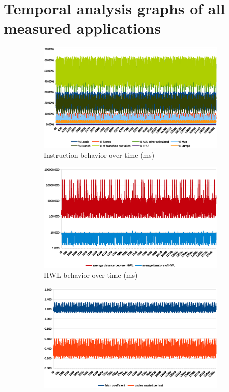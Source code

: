 \documentclass[../bachelor_paper.tex]{subfiles}
\begin{document}
\chapter{Temporal analysis graphs of all measured applications}
    \label{ch:graphs}

\begin{figure}
    \begin{subfigure}{0.45\textwidth}
        \includegraphics[width=\textwidth]{img/graph/coremark/coremark_inst.eps}
        \caption{Instruction behavior over time (ms)}
    \end{subfigure}
    \begin{subfigure}{0.45\textwidth}
        \includegraphics[width=\textwidth]{img/graph/coremark/coremark_hwl.eps}
        \caption{\ac{HWL} behavior over time (ms)}
    \end{subfigure}
    \begin{subfigure}{0.45\textwidth}
        \includegraphics[width=\textwidth]{img/graph/coremark/coremark_fetch_waste.eps}

\end{subfigure}
\end{figure}
\end{document}
